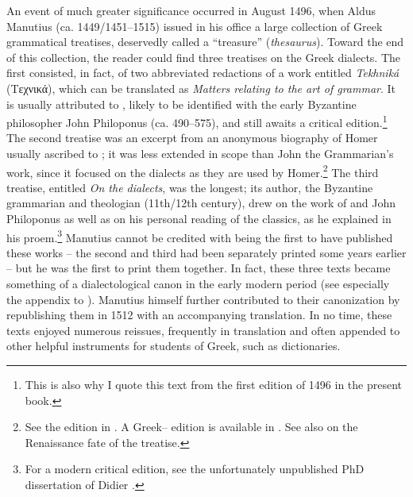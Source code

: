An event of much greater significance occurred in August 1496, when Aldus Manutius (ca. 1449/1451–1515) issued in his  office a large collection of Greek grammatical treatises, deservedly called a “treasure” (\textit{thesaurus}). Toward the end of this collection, the reader could find three treatises on the Greek dialects. The first consisted, in fact, of two abbreviated redactions of a work entitled \textit{Tekhniká} (Tεχνικά), which can be translated as \textit{Matters relating to the art of grammar}. It is usually attributed to , likely to be identified with the early Byzantine philosopher John Philoponus (ca. 490–575), and still awaits a critical edition.\footnote{This is also why I quote this text from the first edition of 1496 in the present book.} The second treatise was an excerpt from an anonymous biography of Homer usually ascribed to ; it was less extended in scope than John the Grammarian’s work, since it focused on the dialects as they are used by Homer.\footnote{See the edition in \citet{Kindstrand1990}. A Greek– edition is available in \citet{Keaney1996}. See also \citet{VanRooy2018c} on the Renaissance fate of the treatise.} The third treatise, entitled \textit{On the dialects}, was the longest; its author, the Byzantine grammarian and theologian  (11th/12th century), drew on the work of  and John Philoponus as well as on his personal reading of the classics, as he explained in his proem.\footnote{For a modern critical edition, see the unfortunately unpublished PhD dissertation of Didier \citet{Xhardez1991}.} Manutius cannot be credited with being the first to have published these works – the second and third had been separately printed some years earlier – but he was the first to print them together. In fact, these three texts became something of a dialectological canon in the early modern period (see especially the appendix to \citealt{Trovato1984}). Manutius himself further contributed to their canonization by republishing them in 1512 with an accompanying  translation. In no time, these texts enjoyed numerous reissues, frequently in  translation and often appended to other helpful instruments for students of Greek, such as dictionaries.

